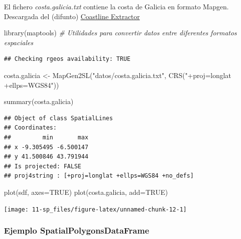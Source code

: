 \documentclass[
  spanish,
]{book}
\newenvironment{Shaded}{\begin{snugshade}}{\end{snugshade}}
\newcommand{\AttributeTok}[1]{\textcolor[rgb]{0.77,0.63,0.00}{#1}}
\newcommand{\CommentTok}[1]{\textcolor[rgb]{0.56,0.35,0.01}{\textit{#1}}}
\newcommand{\ConstantTok}[1]{\textcolor[rgb]{0.00,0.00,0.00}{#1}}
\newcommand{\FunctionTok}[1]{\textcolor[rgb]{0.00,0.00,0.00}{#1}}
\newcommand{\NormalTok}[1]{#1}
\newcommand{\OtherTok}[1]{\textcolor[rgb]{0.56,0.35,0.01}{#1}}
\newcommand{\StringTok}[1]{\textcolor[rgb]{0.31,0.60,0.02}{#1}}
\theoremstyle{break}
\theoremstyle{definition}
\theoremstyle{definition}
\theoremstyle{definition}
\theoremstyle{definition}
\theoremstyle{remark}
\begin{document}
El fichero \emph{costa.galicia.txt} contiene la costa de Galicia en formato Mapgen.
Descargada del (difunto) \href{http://www.ngdc.noaa.gov/mgg/shorelines/shorelines.html}{Coastline Extractor}

\begin{Shaded}
\begin{Highlighting}[]
\FunctionTok{library}\NormalTok{(maptools) }\CommentTok{\# Utilidades para convertir datos entre diferentes formatos espaciales}
\end{Highlighting}
\end{Shaded}

\begin{verbatim}
## Checking rgeos availability: TRUE
\end{verbatim}

\begin{Shaded}
\begin{Highlighting}[]
\NormalTok{costa.galicia }\OtherTok{\textless{}{-}} \FunctionTok{MapGen2SL}\NormalTok{(}\StringTok{"datos/costa.galicia.txt"}\NormalTok{, }\FunctionTok{CRS}\NormalTok{(}\StringTok{"+proj=longlat +ellps=WGS84"}\NormalTok{))}

\FunctionTok{summary}\NormalTok{(costa.galicia)}
\end{Highlighting}
\end{Shaded}

\begin{verbatim}
## Object of class SpatialLines
## Coordinates:
##         min       max
## x -9.305495 -6.500147
## y 41.500846 43.791944
## Is projected: FALSE 
## proj4string : [+proj=longlat +ellps=WGS84 +no_defs]
\end{verbatim}

\begin{Shaded}
\begin{Highlighting}[]
\FunctionTok{plot}\NormalTok{(sdf, }\AttributeTok{axes=}\ConstantTok{TRUE}\NormalTok{)}
\FunctionTok{plot}\NormalTok{(costa.galicia, }\AttributeTok{add=}\ConstantTok{TRUE}\NormalTok{)}
\end{Highlighting}
\end{Shaded}

\begin{center}\texttt{[image: 11-sp\_files/figure-latex/unnamed-chunk-12-1]} \end{center}

\hypertarget{ejemplo-spatialpolygonsdataframe}{%
\subsubsection{Ejemplo SpatialPolygonsDataFrame}\label{ejemplo-spatialpolygonsdataframe}}
\end{document}
